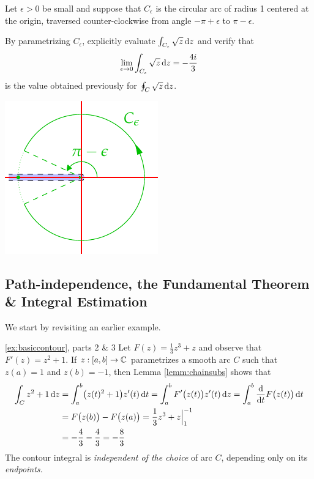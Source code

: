 \begin{exercises}
\begin{enumerate}
		
		\begin{minipage}[t]{0.7\linewidth}\vspace{0pt}
			\item Let $\epsilon>0$ be small and suppose that $C_\epsilon$ is the circular arc of radius 1 centered at the origin, traversed counter-clockwise from angle $-\pi+\epsilon$ to $\pi-\epsilon$.\par
			By parametrizing $C_\epsilon$, explicitly evaluate $\int_{C_\epsilon}\sqrt z\,{\mathrm{d} z}$ and verify that
			\[
				\lim_{\epsilon\to 0}\int_{C_\epsilon}\sqrt z\,{\mathrm{d} z} =-\frac{4i}3
			\]
			is the value obtained previously for $\oint_C\sqrt z\,{\mathrm{d} z}$. 
		\end{minipage}
		\hfill
		\begin{minipage}[t]{0.29\linewidth}\vspace{0pt}
			\flushright\includegraphics{contour-branch4}
		\end{minipage}
	
	  
	\end{enumerate}
\end{exercises}
\clearpage




\subsection[The Fundamental Theorem of Calculus]{Path-independence, the Fundamental Theorem \& Integral Estimation}\label{sec:ftc}

We start by revisiting an earlier example.

\begin{example*}{\ref{ex:basiccontour}, parts 2 \& 3}{}
	Let $F(z)=\frac 13z^3+z$ and observe that $F'(z)=z^2+1$. If $z:[a,b]\to \mathbb{C}$ parametrizes a smooth arc $C$ such that $z(a)=1$ and $z(b)=-1$, then Lemma \ref{lemm:chainsubs} shows that
	\begin{align*}
		\int_Cz^2+1\,{\mathrm{d} z}&=\int_a^b\bigl(z(t)^2+1\bigr)z'(t)\,{\mathrm{d} t} =\int_a^bF'\bigl(z(t)\bigr)z'(t)\,{\mathrm{d} z} =\int_a^b\frac{\mathrm{d} }{\mathrm{d} t}F\bigl(z(t)\bigr)\,{\mathrm{d} t}\\
		&=F\bigl(z(b)\bigr)-F\bigl(z(a)\bigr) = \frac 13z^3+z\Big|_1^{-1}\\
		&=-\frac 43-\frac 43=-\frac 83
	\end{align*}
	The contour integral is \emph{independent of the choice} of arc $C$, depending only on its \emph{endpoints.}
\end{example*}


